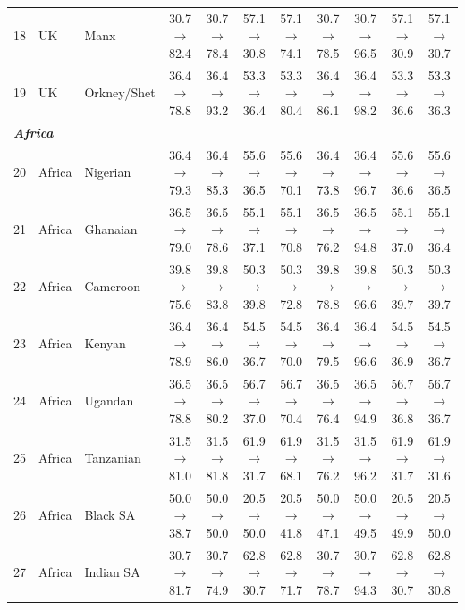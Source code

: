 \begin{table}[t]
{\begin{tabular}{rll c c c c c c c c}
18 & UK & Manx & 30.7$\rightarrow$82.4 & 30.7$\rightarrow$78.4 & 57.1$\rightarrow$30.8 & 57.1$\rightarrow$74.1 & 30.7$\rightarrow$78.5 & 30.7$\rightarrow$96.5 & 57.1$\rightarrow$30.9 & 57.1$\rightarrow$30.7 \\
19 & UK & Orkney/Shet & 36.4$\rightarrow$78.8 & 36.4$\rightarrow$93.2 & 53.3$\rightarrow$36.4 & 53.3$\rightarrow$80.4 & 36.4$\rightarrow$86.1 & 36.4$\rightarrow$98.2 & 53.3$\rightarrow$36.6 & 53.3$\rightarrow$36.3 \\
\midrule
\multicolumn{11}{l}{\textit{\textbf{Africa}}} \\
20 & Africa & Nigerian & 36.4$\rightarrow$79.3 & 36.4$\rightarrow$85.3 & 55.6$\rightarrow$36.5 & 55.6$\rightarrow$70.1 & 36.4$\rightarrow$73.8 & 36.4$\rightarrow$96.7 & 55.6$\rightarrow$36.6 & 55.6$\rightarrow$36.5 \\
21 & Africa & Ghanaian & 36.5$\rightarrow$79.0 & 36.5$\rightarrow$78.6 & 55.1$\rightarrow$37.1 & 55.1$\rightarrow$70.8 & 36.5$\rightarrow$76.2 & 36.5$\rightarrow$94.8 & 55.1$\rightarrow$37.0 & 55.1$\rightarrow$36.4 \\
22 & Africa & Cameroon & 39.8$\rightarrow$75.6 & 39.8$\rightarrow$83.8 & 50.3$\rightarrow$39.8 & 50.3$\rightarrow$72.8 & 39.8$\rightarrow$78.8 & 39.8$\rightarrow$96.6 & 50.3$\rightarrow$39.7 & 50.3$\rightarrow$39.7 \\
23 & Africa & Kenyan & 36.4$\rightarrow$78.9 & 36.4$\rightarrow$86.0 & 54.5$\rightarrow$36.7 & 54.5$\rightarrow$70.0 & 36.4$\rightarrow$79.5 & 36.4$\rightarrow$96.6 & 54.5$\rightarrow$36.9 & 54.5$\rightarrow$36.7 \\
24 & Africa & Ugandan & 36.5$\rightarrow$78.8 & 36.5$\rightarrow$80.2 & 56.7$\rightarrow$37.0 & 56.7$\rightarrow$70.4 & 36.5$\rightarrow$76.4 & 36.5$\rightarrow$94.9 & 56.7$\rightarrow$36.8 & 56.7$\rightarrow$36.7 \\
25 & Africa & Tanzanian & 31.5$\rightarrow$81.0 & 31.5$\rightarrow$81.8 & 61.9$\rightarrow$31.7 & 61.9$\rightarrow$68.1 & 31.5$\rightarrow$76.2 & 31.5$\rightarrow$96.2 & 61.9$\rightarrow$31.7 & 61.9$\rightarrow$31.6 \\
26 & Africa & Black SA & 50.0$\rightarrow$38.7 & 50.0$\rightarrow$50.0 & 20.5$\rightarrow$50.0 & 20.5$\rightarrow$41.8 & 50.0$\rightarrow$47.1 & 50.0$\rightarrow$49.5 & 20.5$\rightarrow$49.9 & 20.5$\rightarrow$50.0 \\
27 & Africa & Indian SA & 30.7$\rightarrow$81.7 & 30.7$\rightarrow$74.9 & 62.8$\rightarrow$30.7 & 62.8$\rightarrow$71.7 & 30.7$\rightarrow$78.7 & 30.7$\rightarrow$94.3 & 62.8$\rightarrow$30.7 & 62.8$\rightarrow$30.8 \\

\end{tabular}}
\end{table}
